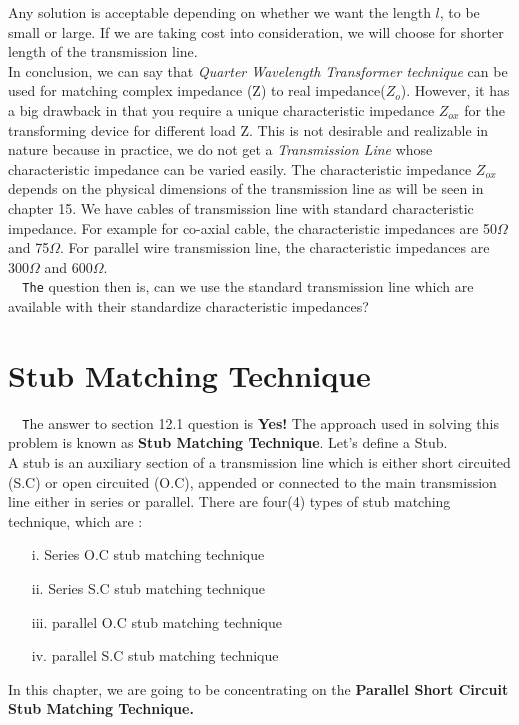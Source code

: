 Any solution is acceptable depending on whether we want the length $l$, to be small or large. If we are taking cost into consideration, we will choose for shorter length of the transmission line.\\

 In conclusion, we can say that\textit{ Quarter Wavelength Transformer technique} can be used for matching complex impedance (Z) to real impedance($Z_o$). However, it has a big drawback in that you require a unique characteristic impedance $Z_{ox}$ for the transforming device for different load Z. This is not desirable and realizable in nature because in practice, we do not get a\textit{ Transmission Line} whose characteristic impedance can be varied easily. The characteristic impedance $Z_{ox}$  depends on the physical dimensions of the transmission line as will be seen in chapter 15. We have cables of transmission line with standard characteristic impedance. For example for co-axial cable, the characteristic impedances are 50$\Omega$ and 75$\Omega$. For parallel wire transmission line, the characteristic impedances are 300$\Omega$ and 600$\Omega$.\\
\verb| 	The| question then is, can we use the standard transmission line which are available with their standardize characteristic impedances?
\section{Stub Matching Technique}
	 	\verb|  T|he answer to section 12.1 question is \textbf{Yes!} The approach used in solving this problem is known as \textbf{Stub Matching Technique}. Let's define a Stub.\\
	 
	  A stub is an auxiliary section of a transmission line which is either short circuited (S.C) or open circuited (O.C), appended or connected to the main transmission line either in series or parallel. There are four(4) types of stub matching technique, which are :\\
\begin{itemize}
\item[i.]Series O.C stub matching technique
\item[ii.]Series S.C stub matching technique
\item[iii.]parallel O.C stub matching technique
\item[iv.]parallel S.C stub matching technique
\end{itemize}
In this chapter, we are going to be concentrating on the \textbf{Parallel Short Circuit Stub Matching Technique.}\\

